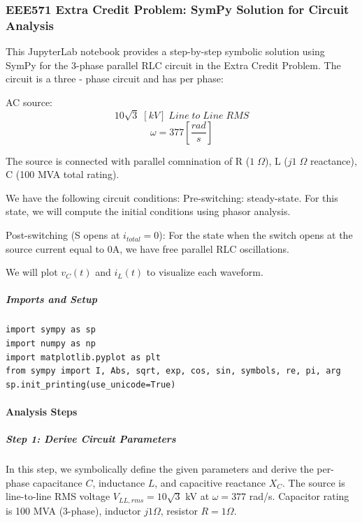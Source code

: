\subsubsection{EEE571 Extra Credit Problem: SymPy Solution for Circuit Analysis}

This JupyterLab notebook provides a step-by-step symbolic solution using SymPy for the 3-phase parallel RLC circuit in the Extra Credit Problem. The circuit is a three - phase circuit and has per phase:

AC source:
\begin{equation}
10\sqrt{3}\; \left[kV\right]\; Line\;to\;Line \;RMS
\end{equation}
\begin{equation}
\omega=377 \left[\frac{rad}{s}\right]
\end{equation}

The source is connected with parallel comnination of R ($1\; \Omega$), L ($j1\; \Omega$ reactance), C (100 MVA total rating). \newline

We have the following circuit conditions:
Pre-switching: steady-state.  For this state, we will compute the initial conditions using phasor analysis.

Post-switching (S opens at $i_{total} = 0$): For the state when the switch opens at the source current equal to 0A, we have free parallel RLC oscillations.

We will plot $v_C(t)$ and $i_L(t)$ to visualize each waveform.

\subparagraph{Imports and Setup}

\begin{verbatim}
import sympy as sp
import numpy as np
import matplotlib.pyplot as plt
from sympy import I, Abs, sqrt, exp, cos, sin, symbols, re, pi, arg
sp.init_printing(use_unicode=True)
\end{verbatim}

\paragraph{Analysis Steps}

\subparagraph{Step 1: Derive Circuit Parameters}

In this step, we symbolically define the given parameters and derive the per-phase capacitance $C$, inductance $L$, and capacitive reactance $X_C$. The source is line-to-line RMS voltage $V_{LL,rms} = 10\sqrt{3}$ kV at $\omega = 377$ rad/s. Capacitor rating is 100 MVA (3-phase), inductor $j1 \Omega$, resistor $R=1 \Omega$.

